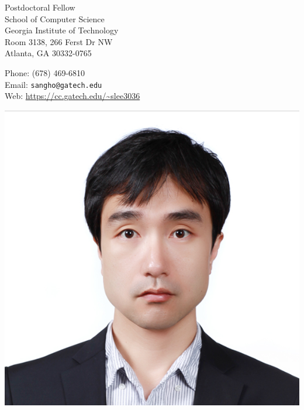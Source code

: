 \begin{minipage}[b]{0.35\textwidth}
  Postdoctoral Fellow\\
  School of Computer Science\\
  Georgia Institute of Technology\\
  Room 3138, 266 Ferst Dr NW\\
  Atlanta, GA 30332-0765
\end{minipage}
\begin{minipage}[b]{0.42\textwidth}
  Phone: (678) 469-6810\\
  Email: \texttt{sangho@gatech.edu} \\
  Web: \url{https://cc.gatech.edu/~slee3036}
\end{minipage}
\begin{minipage}[b]{0.18\textwidth}
\includegraphics[width=\textwidth]{sangho.jpg}
\end{minipage}

